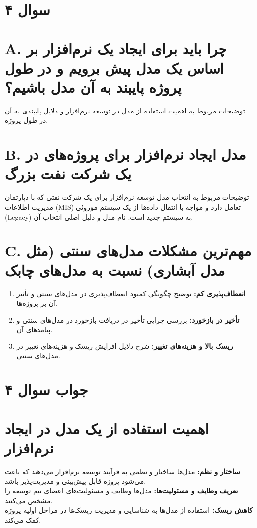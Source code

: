 \section*{سوال ۴}

\section*{A. چرا باید برای ایجاد یک نرم‌افزار بر اساس یک مدل پیش برویم و در طول پروژه پایبند به آن مدل باشیم؟}
توضیحات مربوط به اهمیت استفاده از مدل در توسعه نرم‌افزار و دلایل پایبندی به آن در طول پروژه.

\section*{B. مدل ایجاد نرم‌افزار برای پروژه‌های در یک شرکت نفت بزرگ}
توضیحات مربوط به انتخاب مدل توسعه نرم‌افزار برای یک شرکت نفتی که با دپارتمان مدیریت اطلاعات (MIS) تعامل دارد و مواجه با انتقال داده‌ها از یک سیستم موروثی (Legacy) به سیستم جدید است. نام مدل و دلیل اصلی انتخاب آن.

\section*{C. مهم‌ترین مشکلات مدل‌های سنتی (مثل مدل آبشاری) نسبت به مدل‌های چابک}
\begin{enumerate}
	\item \textbf{انعطاف‌پذیری کم:} توضیح چگونگی کمبود انعطاف‌پذیری در مدل‌های سنتی و تأثیر آن بر پروژه‌ها.
	\item \textbf{تأخیر در بازخورد:} بررسی چرایی تأخیر در دریافت بازخورد در مدل‌های سنتی و پیامدهای آن.
	\item \textbf{ریسک بالا و هزینه‌های تغییر:} شرح دلایل افزایش ریسک و هزینه‌های تغییر در مدل‌های سنتی.
\end{enumerate}

\section*{جواب سوال ۴}

\section*{ اهمیت استفاده از یک مدل در ایجاد نرم‌افزار}
\textbf{ساختار و نظم:} مدل‌ها ساختار و نظمی به فرآیند توسعه نرم‌افزار می‌دهند که باعث می‌شود پروژه قابل پیش‌بینی و مدیریت‌پذیر باشد. \\
\textbf{تعریف وظایف و مسئولیت‌ها:} مدل‌ها وظایف و مسئولیت‌های اعضای تیم توسعه را مشخص می‌کنند. \\
\textbf{کاهش ریسک:} استفاده از مدل‌ها به شناسایی و مدیریت ریسک‌ها در مراحل اولیه پروژه کمک می‌کند.

